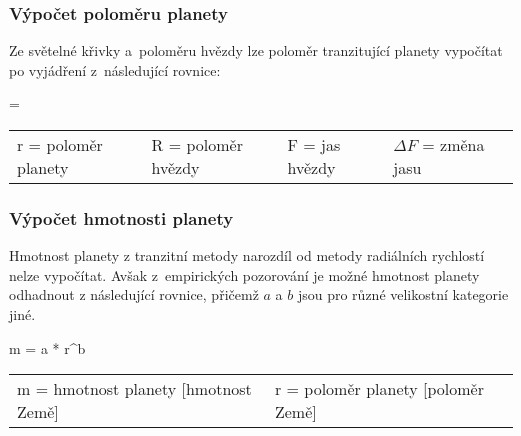 \documentclass[a4paper,12pt]{article}
\begin{document}
\subsubsection{Výpočet poloměru planety}

Ze světelné křivky a~poloměru hvězdy lze poloměr tranzitující planety vypočítat po vyjádření z~následující rovnice:

 { = }{
\begin{tabular}{llll}
	r = poloměr planety & R = poloměr hvězdy & F = jas hvězdy & $\Delta F$ = změna jasu \
\end{tabular}
}

\subsubsection{Výpočet hmotnosti planety}

Hmotnost planety z tranzitní metody narozdíl od metody radiálních rychlostí nelze vypočítat. Avšak z~empirických pozorování je možné hmotnost planety odhadnout z následující rovnice, přičemž $a$ a $b$ jsou pro různé velikostní kategorie jiné.

 {m = a * r^b}{
\begin{tabular}{ll}
	m = hmotnost planety [hmotnost Země] & r = poloměr planety [poloměr Země] \
\end{tabular}
}
\end{document}
